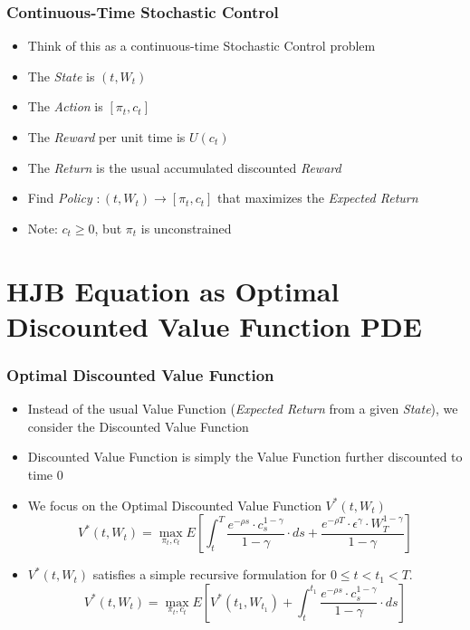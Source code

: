 \documentclass[handout]{beamer}
\begin{document}
\begin{frame}
\frametitle{Continuous-Time Stochastic Control}
\pause
\begin{itemize}[<+->]
\item Think of this as a continuous-time Stochastic Control problem
\item The {\em State} is $(t, W_t)$
\item The {\em Action} is $[\pi_t, c_t]$
\item The {\em Reward} per unit time is $U(c_t)$ 
\item The {\em Return} is the usual accumulated discounted {\em Reward}
\item Find {\em Policy} $: (t, W_t) \rightarrow [\pi_t, c_t]$ that maximizes the {\em Expected Return}
\item Note: $c_t \geq 0$, but $\pi_t$ is unconstrained
\end{itemize}
\end{frame}

\section{HJB Equation as Optimal Discounted Value Function PDE}

\begin{frame}
\frametitle{Optimal Discounted Value Function}
\pause
\begin{itemize}[<+->]
\item Instead of the usual Value Function ({\em Expected Return} from a given {\em State}), we consider the Discounted Value Function
\item Discounted Value Function is simply the Value Function further discounted to time 0
\item We focus on the Optimal Discounted Value Function $V^*(t, W_t)$
$$V^*(t, W_t) = \max_{\pi_t, c_t} E[\int_t^T \frac {e^{-\rho s} \cdot c_s^{1-\gamma}}{1 - \gamma} \cdot ds + \frac {e^{-\rho T} \cdot \epsilon^{\gamma} \cdot W_T^{1-\gamma}} {1 - \gamma} ]$$
\item $V^*(t, W_t)$ satisfies a simple recursive formulation for $0 \leq t < t_1 < T$.
$$V^*(t, W_t) = \max_{\pi_t, c_t} E[V^*(t_1, W_{t_1}) + \int_t^{t_1} \frac {e^{-\rho s} \cdot c_s^{1-\gamma}} {1 - \gamma} \cdot ds]$$
\end{itemize}
\end{frame}
\end{document}
